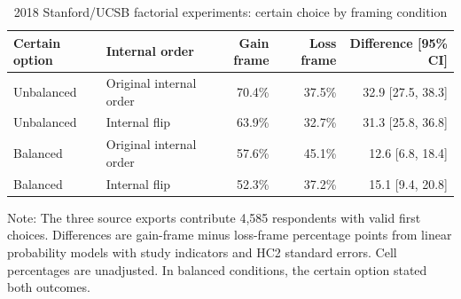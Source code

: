 \begin{table}[H]
\centering
\caption{\label{tab:protzko-effects}2018 Stanford/UCSB factorial experiments: certain choice by framing condition}
\centering
\begin{threeparttable}
\begin{tabular}[t]{llrrr}
\toprule
Certain option & Internal order & Gain frame & Loss frame & Difference [95\% CI]\\
\midrule
Unbalanced & Original internal order & 70.4\% & 37.5\% & 32.9 [27.5, 38.3]\\
Unbalanced & Internal flip & 63.9\% & 32.7\% & 31.3 [25.8, 36.8]\\
Balanced & Original internal order & 57.6\% & 45.1\% & 12.6 [6.8, 18.4]\\
Balanced & Internal flip & 52.3\% & 37.2\% & 15.1 [9.4, 20.8]\\
\bottomrule
\end{tabular}
\begin{tablenotes}[para]
\item Note: The three source exports contribute 4,585 respondents with valid first choices. Differences are gain-frame minus loss-frame percentage points from linear probability models with study indicators and HC2 standard errors. Cell percentages are unadjusted. In balanced conditions, the certain option stated both outcomes.
\end{tablenotes}
\end{threeparttable}
\end{table}
